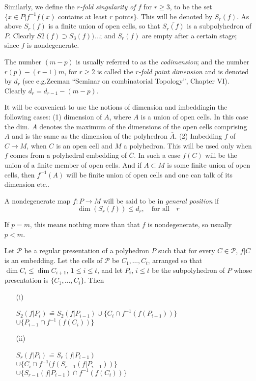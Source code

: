 Similarly, we define the {\em $r$-fold singularity of $f$} for $r\geq 3$, to be the set $\{x\in P|f^{-1}f(x)$ contains at least $r$ points$\}$. This will be denoted by $S_{r}(f)$. As above $S_{r}(f)$ is a finite union of open cells, so that $\overline{S_{r}(f)}$ is a subpolyhedron of $P$. Clearly $S{2}(f)\supset S_{3}(f))\ldots$; and $S_{r}(f)$ are empty after a certain stage; since $f$ is nondegenerate.

The number $(m-p)$ is usually referred to as the {\em codimension}; and the number $r(p)-(r-1)m$, for $r\geq 2$ is called the {\em $r$-fold point dimension} and is denoted by $d_{r}$ (see e.g.\@ Zeeman ``Seminar on combinatorial Topology'', Chapter VI). Clearly $d_{r}=d_{r-1}-(m-p)$. 

It will be convenient to use the notions of dimension and imbedding\pageoriginale in the following cases: (1) dimension of $A$, where $A$ is a union of open cells. In this case the dim. $A$ denotes the maximum of the dimensions of the open cells comprising $A$ and is the same as the dimension of the polyhedron $\overline{A}$. (2) Imbedding $f$ of $C\to M$, when $C$ is an open cell and $M$ a polyhedron. This will be used only when $f$ comes from a polyhedral embedding of $\overline{C}$. In such a case $f(C)$ will be the union of a finite member of open cells. And if $A\subset M$ is some finite union of open cells, then $f^{-1}(A)$ will be finite union of open cells and one can talk of its dimension etc..

A nondegenerate map $f:P\to M$ will be said to be in {\em general position} if
$$
\dim (S_{r}(f))\leq d_{r},\quad \text{for all}\quad r
$$

If $p=m$, this means nothing more than that $f$ is nondegenerate, so usually $p<m$. 

\setcounter{proposition}{1}
\begin{proposition}\label{chap5-prop5.4.2}
Let $\mathscr{P}$ be a regular presentation of a polyhedron $P$ such that for every $C\in \mathscr{P}$, $f|C$ is an embedding. Let the cells of $\mathscr{P}$ be $C_{1},\ldots,C_{t}$, arranged so that $\dim C_{i}\leq \dim C_{i+1}$, $1\leq i\leq t$, and let $P_{i}$, $i\leq t$ be the subpolyhedron of $P$ whose presentation is $\{C_{1},\ldots,C_{i}\}$. Then 
\begin{itemize}
\item[\rm(i)] 
\begin{tabbing}
  $S_{2}(f|P_{i})$ \= = $S_{2}(f|P_{i-1})\cup \{C_{i}\cap f^{-1}(f(P_{i-1}))\}$\\[5pt]
 \>\qquad $\cup \{P_{i-1}\cap f^{-1}(f(C_{i}))\}$
\end{tabbing}

\item[\rm(ii)] \begin{tabbing}
$S_{r}(f|P_{i})$ \= = $S_{r}(f|P_{i-1})$\\[4pt]
\>\quad $\cup\{C_{i}\cap f^{-1}(f(S_{r-1}(f|P_{i-1}))\}$\\[4pt]
\>\quad $\cup\{S_{r-1}(f|P_{i-1})\cap f^{-1}(f(C_{i}))\}$ 
\end{tabbing}
\end{itemize}
\end{proposition}

